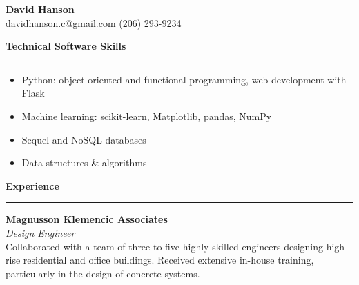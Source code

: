 \documentclass[letterpaper,6pt]{article}
\begin{document}
\begin{center}
{\Large \textbf{David Hanson}}\\
\href{https://www.linkedin.com/in/david-hanson-72561869/}{\faLinkedin}
\href{https://github.com/davidhansonc}{\faGithub}
\href{mailto:davidhanson.c@gmail.com}{\faEnvelope} davidhanson.c@gmail.com 
\textbar{} (206) 293-9234
\end{center}

{\large \textbf{Technical Software Skills}}
\vspace{0.5mm}
\hrule
\vspace{2mm}
\begin{itemize}[noitemsep,topsep=0pt]
    \item  Python: object oriented and functional programming, web development with Flask
    \item  Machine learning: scikit-learn, Matplotlib, pandas, NumPy
    \item  Sequel and NoSQL databases  %
    \item  Data structures \& algorithms
\end{itemize}
\vspace{5mm}

{\large \textbf{Experience}}
\hrule
\vspace{2mm}
\href{https://www.mka.com}{\textbf{Magnusson Klemencic Associates}} \\
\textit{Design Engineer} \\
Collaborated with a team of three to five highly skilled engineers designing high-rise 
residential and office buildings. Received extensive in-house training, particularly in 
the design of concrete systems. 
\end{document}
